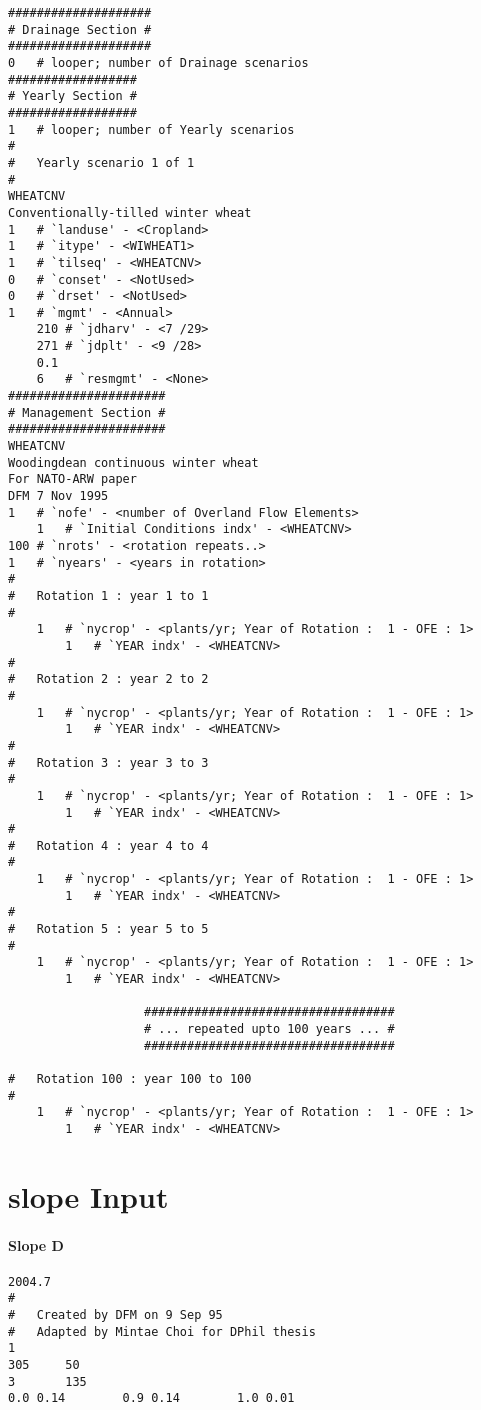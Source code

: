 \begin{verbatim}
####################
# Drainage Section #
####################
0	# looper; number of Drainage scenarios
##################
# Yearly Section #
##################
1	# looper; number of Yearly scenarios
#
#	Yearly scenario 1 of 1
#
WHEATCNV
Conventionally-tilled winter wheat
1	# `landuse' - <Cropland>
1	# `itype' - <WIWHEAT1>
1	# `tilseq' - <WHEATCNV>
0	# `conset' - <NotUsed>
0	# `drset' - <NotUsed>
1	# `mgmt' - <Annual>
	210	# `jdharv' - <7 /29>
	271	# `jdplt' - <9 /28>
	0.1
	6	# `resmgmt' - <None>
######################
# Management Section #
######################
WHEATCNV
Woodingdean continuous winter wheat
For NATO-ARW paper
DFM 7 Nov 1995
1	# `nofe' - <number of Overland Flow Elements>
	1	# `Initial Conditions indx' - <WHEATCNV>
100	# `nrots' - <rotation repeats..>
1	# `nyears' - <years in rotation>
#
#	Rotation 1 : year 1 to 1
#
	1	# `nycrop' - <plants/yr; Year of Rotation :  1 - OFE : 1>
		1	# `YEAR indx' - <WHEATCNV>
#
#	Rotation 2 : year 2 to 2
#
	1	# `nycrop' - <plants/yr; Year of Rotation :  1 - OFE : 1>
		1	# `YEAR indx' - <WHEATCNV>
#
#	Rotation 3 : year 3 to 3
#
	1	# `nycrop' - <plants/yr; Year of Rotation :  1 - OFE : 1>
		1	# `YEAR indx' - <WHEATCNV>
#
#	Rotation 4 : year 4 to 4
#
	1	# `nycrop' - <plants/yr; Year of Rotation :  1 - OFE : 1>
		1	# `YEAR indx' - <WHEATCNV>
#
#	Rotation 5 : year 5 to 5
#
	1	# `nycrop' - <plants/yr; Year of Rotation :  1 - OFE : 1>
		1	# `YEAR indx' - <WHEATCNV>

                   ###################################		
                   # ... repeated upto 100 years ... #
                   ###################################

#	Rotation 100 : year 100 to 100
#
	1	# `nycrop' - <plants/yr; Year of Rotation :  1 - OFE : 1>
		1	# `YEAR indx' - <WHEATCNV>
\end{verbatim}

\section{slope Input}
\label{sec:WEPPSlopeInput}

\paragraph{Slope D}

\scriptsize

\begin{verbatim}
2004.7
#
#   Created by DFM on 9 Sep 95
#   Adapted by Mintae Choi for DPhil thesis
1
305     50
3       135
0.0 0.14		0.9 0.14		1.0 0.01
\end{verbatim}

